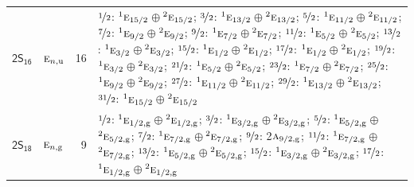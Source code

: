 \documentclass[10pt,a4paper]{article}
\numberwithin{equation}{section}
\newcommand{\grp}[1]{\mathsf{#1}}
\newcommand{\irr}[1]{\text{\normalfont\scshape #1}}
\newcommand{\conjpair}[1]{{}^{#1}}
\newcommand{\ptag}[1]{\mathrm{#1}}
\newlength{\fillwidth}\newlength{\cellwidth}\newlength{\colwidth}
\begin{document}
{\begin{longtable}{@{}llr>{\RaggedRight\arraybackslash}p{\fillwidth}@{}}
\href{2S16.pdf}{$\grp{2S_{16}}$} & $\irr{e}_{n,\ptag{u}}$ & 16 & $\nicefrac{1}{2}$: $\conjpair{1}\irr{e}_{15/2}$${}\oplus{}$$\conjpair{2}\irr{e}_{15/2}$; $\nicefrac{3}{2}$: $\conjpair{1}\irr{e}_{13/2}$${}\oplus{}$$\conjpair{2}\irr{e}_{13/2}$; $\nicefrac{5}{2}$: $\conjpair{1}\irr{e}_{11/2}$${}\oplus{}$$\conjpair{2}\irr{e}_{11/2}$; $\nicefrac{7}{2}$: $\conjpair{1}\irr{e}_{9/2}$${}\oplus{}$$\conjpair{2}\irr{e}_{9/2}$; $\nicefrac{9}{2}$: $\conjpair{1}\irr{e}_{7/2}$${}\oplus{}$$\conjpair{2}\irr{e}_{7/2}$; $\nicefrac{11}{2}$: $\conjpair{1}\irr{e}_{5/2}$${}\oplus{}$$\conjpair{2}\irr{e}_{5/2}$; $\nicefrac{13}{2}$: $\conjpair{1}\irr{e}_{3/2}$${}\oplus{}$$\conjpair{2}\irr{e}_{3/2}$; $\nicefrac{15}{2}$: $\conjpair{1}\irr{e}_{1/2}$${}\oplus{}$$\conjpair{2}\irr{e}_{1/2}$; $\nicefrac{17}{2}$: $\conjpair{1}\irr{e}_{1/2}$${}\oplus{}$$\conjpair{2}\irr{e}_{1/2}$; $\nicefrac{19}{2}$: $\conjpair{1}\irr{e}_{3/2}$${}\oplus{}$$\conjpair{2}\irr{e}_{3/2}$; $\nicefrac{21}{2}$: $\conjpair{1}\irr{e}_{5/2}$${}\oplus{}$$\conjpair{2}\irr{e}_{5/2}$; $\nicefrac{23}{2}$: $\conjpair{1}\irr{e}_{7/2}$${}\oplus{}$$\conjpair{2}\irr{e}_{7/2}$; $\nicefrac{25}{2}$: $\conjpair{1}\irr{e}_{9/2}$${}\oplus{}$$\conjpair{2}\irr{e}_{9/2}$; $\nicefrac{27}{2}$: $\conjpair{1}\irr{e}_{11/2}$${}\oplus{}$$\conjpair{2}\irr{e}_{11/2}$; $\nicefrac{29}{2}$: $\conjpair{1}\irr{e}_{13/2}$${}\oplus{}$$\conjpair{2}\irr{e}_{13/2}$; $\nicefrac{31}{2}$: $\conjpair{1}\irr{e}_{15/2}$${}\oplus{}$$\conjpair{2}\irr{e}_{15/2}$\\
\href{2S18.pdf}{$\grp{2S_{18}}$} & $\irr{e}_{n,\ptag{g}}$ & 9 & $\nicefrac{1}{2}$: $\conjpair{1}\irr{e}_{1/2,\ptag{g}}$${}\oplus{}$$\conjpair{2}\irr{e}_{1/2,\ptag{g}}$; $\nicefrac{3}{2}$: $\conjpair{1}\irr{e}_{3/2,\ptag{g}}$${}\oplus{}$$\conjpair{2}\irr{e}_{3/2,\ptag{g}}$; $\nicefrac{5}{2}$: $\conjpair{1}\irr{e}_{5/2,\ptag{g}}$${}\oplus{}$$\conjpair{2}\irr{e}_{5/2,\ptag{g}}$; $\nicefrac{7}{2}$: $\conjpair{1}\irr{e}_{7/2,\ptag{g}}$${}\oplus{}$$\conjpair{2}\irr{e}_{7/2,\ptag{g}}$; $\nicefrac{9}{2}$: 2$\irr{a}_{9/2,\ptag{g}}$; $\nicefrac{11}{2}$: $\conjpair{1}\irr{e}_{7/2,\ptag{g}}$${}\oplus{}$$\conjpair{2}\irr{e}_{7/2,\ptag{g}}$; $\nicefrac{13}{2}$: $\conjpair{1}\irr{e}_{5/2,\ptag{g}}$${}\oplus{}$$\conjpair{2}\irr{e}_{5/2,\ptag{g}}$; $\nicefrac{15}{2}$: $\conjpair{1}\irr{e}_{3/2,\ptag{g}}$${}\oplus{}$$\conjpair{2}\irr{e}_{3/2,\ptag{g}}$; $\nicefrac{17}{2}$: $\conjpair{1}\irr{e}_{1/2,\ptag{g}}$${}\oplus{}$$\conjpair{2}\irr{e}_{1/2,\ptag{g}}$\\

\end{longtable}}
\end{document}
